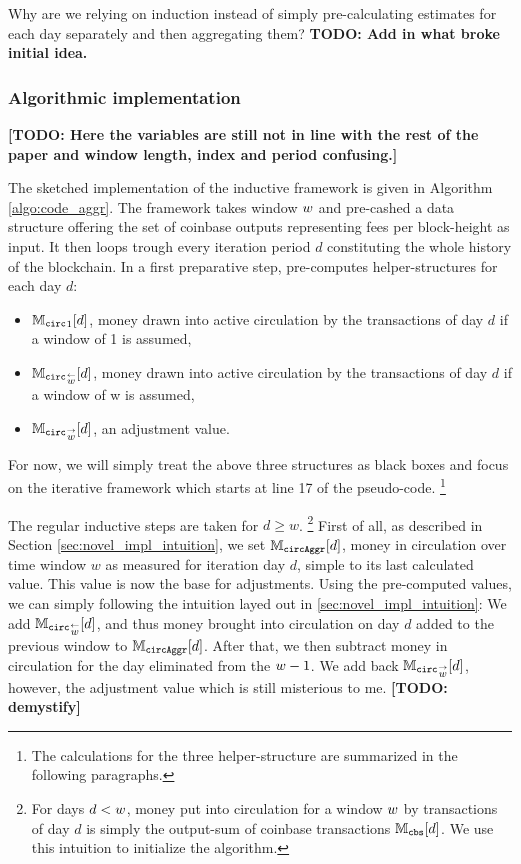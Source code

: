 Why are we relying on induction instead of simply pre-calculating estimates for each day separately and then aggregating them? %
\textbf{TODO: Add in what broke initial idea.}


\subsubsection{Algorithmic implementation}
\label{sec:novel_impl_algo}%
\textbf{[TODO: Here the variables are still not in line with the rest of the paper and window length, index and period confusing.]}

The sketched implementation of the inductive framework is given in Algorithm \ref{algo:code_aggr}. %
The framework takes window \({w}\) and pre-cashed a data structure offering the set of coinbase outputs representing fees per block-height as input. %
It then loops trough every iteration period \(d\) constituting the whole history of the blockchain. %
In a first preparative step, pre-computes helper-structures for each day \(d\):
\begin{itemize}
\item \( {\mathbb{M}_{\mathtt{circ}}}_{1}[d] \), money drawn into active circulation by the transactions of day \( d \) if a window of 1 is assumed,
\item \( {{\mathbb{M}_{\mathtt{circ}}}_{\overset{\leftarrow}{{w}}}}[d] \), money drawn into active circulation by the transactions of day \(d\) if a window of w is assumed,
\item \( {{\mathbb{M}_{\mathtt{circ}}}_{\overset{\rightarrow}{{w}}}}[d] \), an adjustment value. 
\end{itemize}

For now, we will simply treat the above three structures as black boxes and focus on the iterative framework which starts at line 17 of the pseudo-code.%
\footnote{The calculations for the three helper-structure are summarized in the following paragraphs.} %

The regular inductive steps are taken for \(d \geq w \).%
\footnote{
For days \(d < {w} \), money put into circulation for a window \({w}\) by transactions of day \(d\) is simply the output-sum of coinbase transactions \({\mathbb{M}_{{\mathtt{cbs}}}}[d]\). %
We use this intuition to initialize the algorithm.} %
First of all, as described in Section \ref{sec:novel_impl_intuition}, we set \({\mathbb{M}_{\mathtt{circAggr}}}[d]\), money in circulation over time window \(w\) as measured for iteration day \(d\), simple to its last calculated value. %
This value is now the base for adjustments. %
Using the pre-computed values, we can simply following the intuition layed out in \ref{sec:novel_impl_intuition}: %
We add \({{\mathbb{M}_{\mathtt{circ}}}_{\overset{\leftarrow}{{w}}}}[d]\), and thus money brought into circulation on day \(d\) added to the previous window to \({\mathbb{M}_{\mathtt{circAggr}}}[d]\). %
After that, we then subtract money in circulation for the day eliminated from the \({w} - 1\). %
We add back \( {{\mathbb{M}_{\mathtt{circ}}}_{\overset{\rightarrow}{{w}}}}[d] \), however, the adjustment value which is still misterious to me. %
\textbf{[TODO: demystify]}

